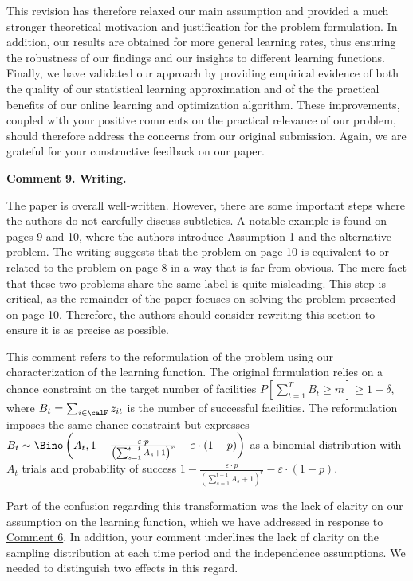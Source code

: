 \documentclass[11pt]{article}
\begin{document}
This revision has therefore relaxed our main assumption and provided a much stronger theoretical motivation and justification for the problem formulation. In addition, our results are obtained for more general learning rates, thus ensuring the robustness of our findings and our insights to different learning functions. Finally, we have validated our approach by providing empirical evidence of both the quality of our statistical learning approximation and of the the practical benefits of our online learning and optimization algorithm. These improvements, coupled with your positive comments on the practical relevance of our problem, should therefore address the concerns from our original submission. Again, we are grateful for your constructive feedback on our paper.

\begin{commentBox}
\textbf{Comment 9. Writing.}\label{R1:9}

    The paper is overall well-written. However, there are some important steps where the authors do not carefully discuss subtleties. A notable example is found on pages 9 and 10, where the authors introduce Assumption 1 and the alternative problem. The writing suggests that the problem on page 10 is equivalent to or related to the problem on page 8 in a way that is far from obvious. The mere fact that these two problems share the same label is quite misleading. This step is critical, as the remainder of the paper focuses on solving the problem presented on page 10. Therefore, the authors should consider rewriting this section to ensure it is as precise as possible.
\end{commentBox}

This comment refers to the reformulation of the problem using our characterization of the learning function. The original formulation relies on a chance constraint on the target number of facilities $P\left[\sum_{t=1}^TB_t\geq m\right] \geq 1-\delta$, where $B_t=\sum_{i\in\calF}z_{it}$ is the number of successful facilities. The reformulation imposes the same chance constraint but expresses $B_t\sim \Bino\left(A_t, 1- \frac{\varepsilon\cdot p}{\left(\sum_{s=1}^{t-1} A_s +1\right)^r}-\varepsilon\cdot(1-p)\right)$ as a binomial distribution with $A_t$ trials and probability of success $1- \frac{\varepsilon\cdot p}{\left(\sum_{s=1}^{t-1} A_s +1\right)^r}-\varepsilon\cdot(1-p)$.

Part of the confusion regarding this transformation was the lack of clarity on our assumption on the learning function, which we have addressed in response to \hyperref[R1:6]{\color{blue}Comment 6}. In addition, your comment underlines the lack of clarity on the sampling distribution at each time period and the independence assumptions. We needed to distinguish two effects in this regard.
\end{document}
